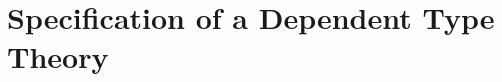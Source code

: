 \documentclass[acmsmall]{acmart}
\begin{document}

\section{Specification of a Dependent Type Theory}
\label{sec:spec}
\end{document}
